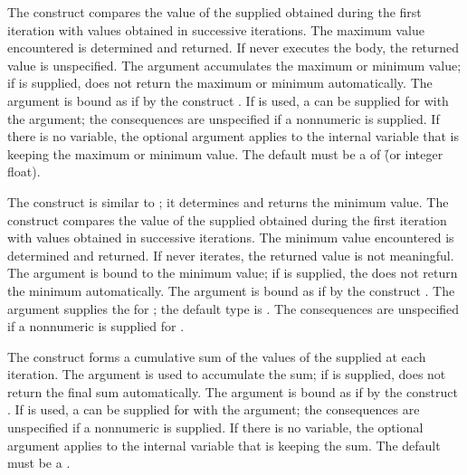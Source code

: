 The  construct compares the value of the supplied 
obtained during the first iteration with values obtained in successive
iterations. The maximum value encountered is determined and returned.  If 
 never executes the body, the returned value is
unspecified.
The argument  accumulates the maximum or
minimum value; if  is supplied, 
does not return the maximum or minimum automatically.  The 
 argument
is bound as if by the construct .
 If   is used, a  can be
supplied for 
with the  argument; the consequences are
unspecified if a nonnumeric 
 is supplied.           
  If there is no  variable, the optional 
  argument applies to the internal variable that is keeping the 
maximum or minimum value.  
  The default  must be a 
  of \f{(or integer float)}.
                             
The  construct is similar to ; it
determines and returns the minimum value.
The  construct compares the value of the supplied  
obtained during the first iteration with values obtained in successive
iterations. The minimum value encountered is determined and returned.  If 
 never iterates, the returned value is not meaningful.
The argument  is 
bound to the minimum value; if  is supplied, the 
does not return the minimum automatically.  The  argument
is bound as if by the construct .
 The  argument supplies the  for ; the
default type is .
The consequences are
unspecified if a nonnumeric 
 is supplied for .
 
The  construct forms a cumulative sum of the values of the
supplied  at each iteration.
The argument  is used to accumulate
the sum; if  is supplied, 
does not return the final sum automatically.  The  argument
is bound as if by the construct .
 If   is used, a  can be
supplied for 
with the  argument; the consequences are
unspecified if a nonnumeric 
 is supplied.           
  If there is no  variable, the optional 
  argument applies to the internal variable that is keeping the 
sum.
  The default  must be a .
 
